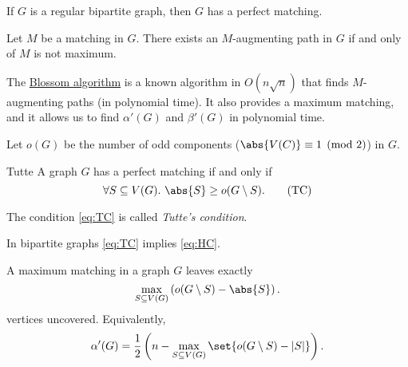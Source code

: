 
\begin{theorem}
    If $G$ is a regular bipartite graph, then $G$ has a perfect matching.
\end{theorem}



\begin{theorem}
    Let $M$ be a matching in $G$. There exists an $M$-augmenting path in $G$ if and only of $M$ is not maximum.
\end{theorem}


The \href{https://en.wikipedia.org/wiki/Blossom_algorithm}{Blossom algorithm} is a known algorithm in $O(n\sqrt{n})$ that finds $M$-augmenting paths
(in polynomial time). It also provides a maximum matching, and it allows us to find $\alpha'(G)$ and $\beta'(G)$ in polynomial time.

Let $o(G)$ be the number of odd components ($\abs{V(C)} \equiv 1 \pmod{2}$) in $G$.

\begin{theorem}{Tutte}
    A graph $G$ has a perfect matching if and only if 
    \begin{equation}
        \forall S\subseteq V(G).~\abs{S}\ge o(G \setminus S). 
        \tag{TC}
        \label{eq:TC}
    \end{equation}
\end{theorem}

The condition \eqref{eq:TC} is called \emph{Tutte's condition}.


\begin{remark}
    In bipartite graphs \eqref{eq:TC} implies \eqref{eq:HC}.
\end{remark}

\begin{theorem}
    A maximum matching in a graph $G$ leaves exactly
    \[
    \max_{S \subseteq V(G)} \left(o(G \setminus S) - \abs{S}\right).
    \]
    vertices uncovered. Equivalently,
    \[
    \alpha'(G) = \frac{1}{2}\left(n - \max_{S \subseteq V(G)} \set{o(G \setminus S) - |S|}\right).
    \]
\end{theorem}

